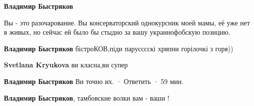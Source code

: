 \begin{itemize}
\begin{itemize}
\textbf{Владимир Быстряков} 

Вы - это разочарование. Вы консерваторский однокурсник моей мамы, её уже нет в
живых, но сейчас ей было бы стыдно за вашу украинофобскую позицию.

 
\textbf{Владимир Быстряков} бістроКОВ,піди парусссскі хряпни горілочкі з горя))

 
\textbf{Svetlana Kryukova} ви класна,ви супер

 
\textbf{Владимир Быстряков} Ви точно их.
 · Ответить · 59 мин.
 
\textbf{Владимир Быстряков}, тамбовские волки вам - ваши !


\end{itemize}

\end{itemize}

